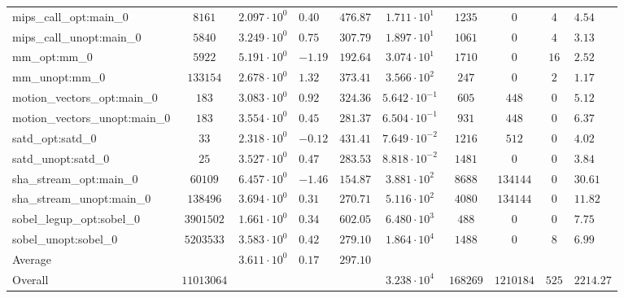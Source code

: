 \begin{tabular}{|l|c|HHc|c|c|c|cH|}
mips\_call\_opt:main\_0                         & $ 8161     $ & $ 2.097 \cdot 10^{0} $ & $ 0.40  $ & $ 476.87 $ & $ 1.711 \cdot 10^{1}  $ & $ 1235   $ & $ 0       $ & $ 4   $ & $ 4.54    $ \\
mips\_call\_unopt:main\_0                       & $ 5840     $ & $ 3.249 \cdot 10^{0} $ & $ 0.75  $ & $ 307.79 $ & $ 1.897 \cdot 10^{1}  $ & $ 1061   $ & $ 0       $ & $ 4   $ & $ 3.13    $ \\
mm\_opt:mm\_0                                   & $ 5922     $ & $ 5.191 \cdot 10^{0} $ & $ -1.19 $ & $ 192.64 $ & $ 3.074 \cdot 10^{1}  $ & $ 1710   $ & $ 0       $ & $ 16  $ & $ 2.52    $ \\
mm\_unopt:mm\_0                                 & $ 133154   $ & $ 2.678 \cdot 10^{0} $ & $ 1.32  $ & $ 373.41 $ & $ 3.566 \cdot 10^{2}  $ & $ 247    $ & $ 0       $ & $ 2   $ & $ 1.17    $ \\
motion\_vectors\_opt:main\_0                    & $ 183      $ & $ 3.083 \cdot 10^{0} $ & $ 0.92  $ & $ 324.36 $ & $ 5.642 \cdot 10^{-1} $ & $ 605    $ & $ 448     $ & $ 0   $ & $ 5.12    $ \\
motion\_vectors\_unopt:main\_0                  & $ 183      $ & $ 3.554 \cdot 10^{0} $ & $ 0.45  $ & $ 281.37 $ & $ 6.504 \cdot 10^{-1} $ & $ 931    $ & $ 448     $ & $ 0   $ & $ 6.37    $ \\
satd\_opt:satd\_0                               & $ 33       $ & $ 2.318 \cdot 10^{0} $ & $ -0.12 $ & $ 431.41 $ & $ 7.649 \cdot 10^{-2} $ & $ 1216   $ & $ 512     $ & $ 0   $ & $ 4.02    $ \\
satd\_unopt:satd\_0                             & $ 25       $ & $ 3.527 \cdot 10^{0} $ & $ 0.47  $ & $ 283.53 $ & $ 8.818 \cdot 10^{-2} $ & $ 1481   $ & $ 0       $ & $ 0   $ & $ 3.84    $ \\
sha\_stream\_opt:main\_0                        & $ 60109    $ & $ 6.457 \cdot 10^{0} $ & $ -1.46 $ & $ 154.87 $ & $ 3.881 \cdot 10^{2}  $ & $ 8688   $ & $ 134144  $ & $ 0   $ & $ 30.61   $ \\
sha\_stream\_unopt:main\_0                      & $ 138496   $ & $ 3.694 \cdot 10^{0} $ & $ 0.31  $ & $ 270.71 $ & $ 5.116 \cdot 10^{2}  $ & $ 4080   $ & $ 134144  $ & $ 0   $ & $ 11.82   $ \\
sobel\_legup\_opt:sobel\_0                      & $ 3901502  $ & $ 1.661 \cdot 10^{0} $ & $ 0.34  $ & $ 602.05 $ & $ 6.480 \cdot 10^{3}  $ & $ 488    $ & $ 0       $ & $ 0   $ & $ 7.75    $ \\
sobel\_unopt:sobel\_0                           & $ 5203533  $ & $ 3.583 \cdot 10^{0} $ & $ 0.42  $ & $ 279.10 $ & $ 1.864 \cdot 10^{4}  $ & $ 1488   $ & $ 0       $ & $ 8   $ & $ 6.99    $ \\
\hline
Average                                         & $          $ & $ 3.611 \cdot 10^{0} $ & $ 0.17  $ & $ 297.10 $ & $                     $ & $        $ & $         $ & $     $ & $         $ \\
\hline
Overall                                         & $ 11013064 $ & $                    $ & $       $ & $        $ & $ 3.238 \cdot 10^{4}  $ & $ 168269 $ & $ 1210184 $ & $ 525 $ & $ 2214.27 $ \\
\hline
\end{tabular}
